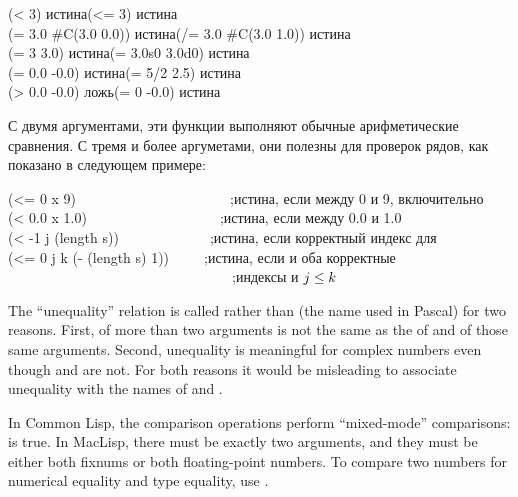 \begin{defun}[Function]
\begin{lisp}
(< 3) \textrm{истина}\>(<= 3) \textrm{истина} \\
(= 3.0 \#C(3.0 0.0)) \textrm{истина}\>(/= 3.0 \#C(3.0 1.0)) \textrm{истина} \\
(= 3 3.0) \textrm{истина}\>(= 3.0s0 3.0d0) \textrm{истина} \\
(= 0.0 -0.0) \textrm{истина}\>(= 5/2 2.5) \textrm{истина} \\
(> 0.0 -0.0) \textrm{ложь}\>(= 0 -0.0) \textrm{истина}
\end{lisp}
С двумя аргументами, эти функции выполняют обычные арифметические сравнения.
С тремя и более аргуметами, они полезны для проверок рядов, как показано в
следующем примере:
\begin{lisp}
(<= 0 x 9)~~~~~~~~~~~~~~~~~~~~~~;\textrm{истина, если  между 0 и 9, включительно} \\
(< 0.0 x 1.0)~~~~~~~~~~~~~~~~~~~;\textrm{истина, если  между 0.0 и 1.0} \\
(< -1 j (length s))~~~~~~~~~~~~~;\textrm{истина, если  корректный индекс для } \\
(<= 0 j k (- (length s) 1))~~~~~;\textrm{истина, если  и  оба корректные} \\
~~~~~~~~~~~~~~~~~~~~~~~~~~~~~~~~;\textrm{индексы  и $\cdf{j}\leq\cdf{k}$}
\end{lisp}

\beforenoterule
\begin{rationale}
The ``unequality'' relation is called \cdf{/=} rather than
\cd{<>}
(the name used in Pascal) for two reasons.  First, \cdf{/=} of more than two
arguments is not the same as the  of \cdf{<} and \cdf{>} of those same
arguments.  Second, unequality is meaningful for complex numbers even though
\cdf{<} and \cdf{>} are not.  For both reasons it would be misleading to
associate unequality with the names of \cdf{<} and \cdf{>}.
\end{rationale}
\betweennoterule
\begin{incompatibility}
In Common Lisp, the comparison operations
perform ``mixed-mode'' comparisons:  is true.  In MacLisp,
there must be exactly two arguments, and they must be either both fixnums
or both floating-point numbers.  To compare two numbers for numerical
equality and type equality, use .
\end{incompatibility}
\afternoterule
\end{defun}

